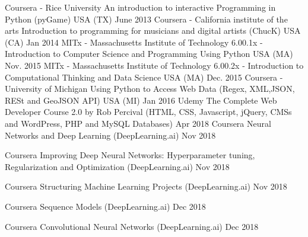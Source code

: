 \begin{cvhonors}
  \cvhonor
    {Coursera - Rice University }
    {An introduction to interactive Programming in Python (pyGame)}
    {USA (TX)}
    {June 2013}
  \cvhonor
    {Coursera - California institute of the arts}
    {Introduction to programming for musicians and digital artists (ChucK)}
    {USA (CA)}
    {Jan 2014}
  \cvhonor
    {MITx - Massachusetts Institute of Technology}
    {6.00.1x - Introduction to Computer Science and Programming Using Python}
    {USA (MA)}
    {Nov. 2015}
  \cvhonor
    {MITx - Massachusetts Institute of Technology}
    {6.00.2x - Introduction to Computational Thinking and Data Science}
    {USA (MA)}
    {Dec. 2015}
  \cvhonor
    {Coursera - University of Michigan}
    {Using Python to Access Web Data (Regex, XML,JSON, RESt and GeoJSON API)}
    {USA (MI)}
    {Jan 2016}
  \cvhonor
    {Udemy}
    {The Complete Web Developer Course 2.0 by Rob Percival (HTML, CSS, Javascript, jQuery, CMSs and WordPress, PHP and MySQL Databases)}
    {}
    {Apr 2018}
    \cvhonor
    {Coursera}
    {Neural Networks and Deep Learning (DeepLearning.ai)}
    {}
    {Nov 2018}
    
    \cvhonor
    {Coursera}
    {Improving Deep Neural Networks: Hyperparameter tuning, Regularization and Optimization (DeepLearning.ai)}
    {}
    {Nov 2018}
    
    \cvhonor
    {Coursera}
    {Structuring Machine Learning Projects (DeepLearning.ai)}
    {}
    {Nov 2018}
    
    \cvhonor
    {Coursera}
    {Sequence Models (DeepLearning.ai)}
    {}
    {Dec 2018}
    
    \cvhonor
    {Coursera}
    {Convolutional Neural Networks (DeepLearning.ai)}
    {}
    {Dec 2018}    
    
\end{cvhonors}
